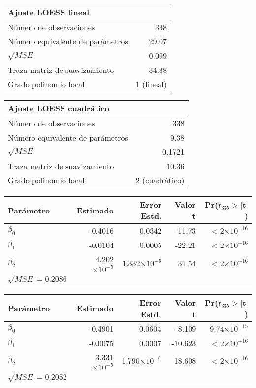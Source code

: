 \documentclass[11pt]{article}
\begin{document}
\begin{table}[ht]
\centering
\begin{tabular}{lr}
 Ajuste LOESS lineal & \\ 
 \hline
 Número de observaciones & 338 \\
 Número equivalente de parámetros & 29.07 \\
 $\sqrt{MSE}$ & 0.099 \\
 Traza matriz de suavizamiento & 34.38\\
Grado polinomio local & 1 (lineal)\\
   \hline
\end{tabular}
\end{table}

\begin{table}[ht]
\centering
\begin{tabular}{lr}
 Ajuste LOESS cuadrático & \\ 
 \hline
 Número de observaciones & 338 \\
 Número equivalente de parámetros & 9.38 \\
 $\sqrt{MSE}$ & 0.1721 \\
 Traza matriz de suavizamiento & 10.36\\
Grado polinomio local & 2 (cuadrático)\\
   \hline
\end{tabular}
\end{table}

\begin{table}[ht]
\centering
\begin{tabular}{lrrrr}

 Parámetro & Estimado & Error Estd. & Valor t & Pr($t_{335}>$$|$t$|$) \\ 
  \hline
$\beta_0$ & -0.4016 & 0.0342 & -11.73 & $<$2$\times10^{-16}$ \\ 
  $\beta_1$ & -0.0104 & 0.0005 & -22.21 & $<$2$\times10^{-16}$ \\ 
  $\beta_2$ & 4.202$\times10^{-5}$ & 1.332$\times10^{-6}$ & 31.54 & $<$2$\times10^{-16}$ \\ 
   \hline
   $\sqrt{MSE}=0.2086$\\
   \hline
\end{tabular}
\end{table}

\begin{table}[ht]
\centering
\begin{tabular}{lrrrr}

 Parámetro & Estimado & Error Estd. & Valor t & Pr($t_{335}>$$|$t$|$) \\ 
  \hline
$\beta_0$ & -0.4901 & 0.0604 & -8.109 & 9.74$\times10^{-15}$ \\ 
  $\beta_1$ & -0.0075 & 0.0007 & -10.623 & $<$2$\times10^{-16}$ \\ 
  $\beta_2$ & 3.331$\times10^{-5}$ & 1.790$\times10^{-6}$ & 18.608 & $<$2$\times10^{-16}$ \\ 
   \hline
   $\sqrt{MSE}=0.2052$\\
   \hline
\end{tabular}
\end{table}
\end{document}
